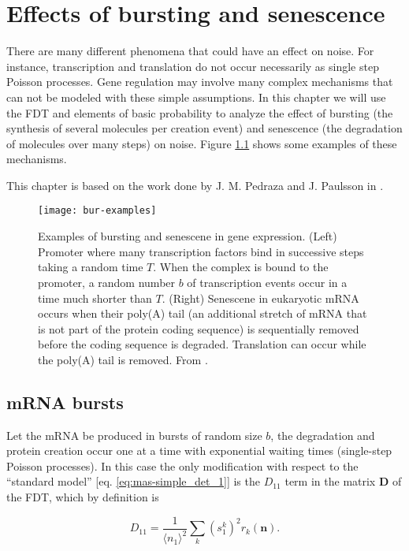 \chapter{Effects of bursting and senescence}

There are many different phenomena that could have an effect on noise. For instance, transcription and translation do not occur necessarily as single step Poisson processes. Gene regulation may involve many complex mechanisms that can not be modeled with these simple assumptions. In this chapter we will use the FDT and elements of basic probability to analyze the effect of bursting (the synthesis of several molecules per creation event) and senescence (the degradation of molecules over many steps) on noise. Figure \ref{fig:bur-examples} shows some examples of these mechanisms.

This chapter is based on the work done by J. M. Pedraza and J. Paulsson in \cite{pedraza08}.

\begin{figure}[H]
  \centering
  \texttt{[image: bur-examples]}
  \caption[Examples of bursting and senescence in gene expression]{\label{fig:bur-examples} Examples of bursting and senescene in gene expression. (Left) Promoter where many transcription factors bind in successive steps taking a random time $T$. When the complex is bound to the promoter, a random number $b$ of transcription events occur in a time much shorter than $T$. (Right) Senescene in eukaryotic mRNA occurs when their poly(A) tail (an additional stretch of mRNA that is not part of the protein coding sequence) is sequentially removed before the coding sequence is degraded. Translation can occur while the poly(A) tail is removed. From \cite{pedraza08}.}
\end{figure}

\section{mRNA bursts}
Let the mRNA be produced in bursts of random size $b$, the degradation and protein creation occur one at a time with exponential waiting times (single-step Poisson processes). In this case the only modification with respect to the ``standard model'' [eq. \eqref{eq:mas-simple_det_1}] is the $D_{11}$ term in the matrix $\mathbf{D}$ of the FDT, which by definition is

\begin{equation}
  \label{eq:mrnab1}
  D_{11}=\frac{1}{\langle n_1\rangle^2}\sum_k(s_1^k)^2r_k(\mathbf{n}).
\end{equation}

